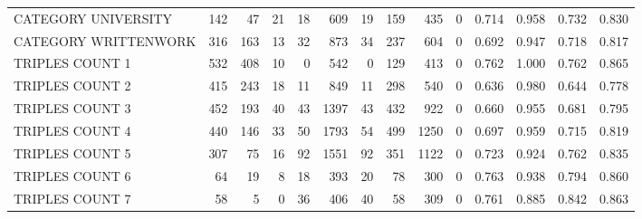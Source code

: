 \begin{tabular}{lrrrrrrrrrllll}
 CATEGORY UNIVERSITY      &             142 &            47 &              21 &              18 &             609 &   19 &  159 &  435 &    0 & 0.714 & 0.958 & 0.732 & 0.830 \\
 CATEGORY WRITTENWORK     &             316 &           163 &              13 &              32 &             873 &   34 &  237 &  604 &    0 & 0.692 & 0.947 & 0.718 & 0.817 \\
 TRIPLES COUNT 1          &             532 &           408 &              10 &               0 &             542 &    0 &  129 &  413 &    0 & 0.762 & 1.000 & 0.762 & 0.865 \\
 TRIPLES COUNT 2          &             415 &           243 &              18 &              11 &             849 &   11 &  298 &  540 &    0 & 0.636 & 0.980 & 0.644 & 0.778 \\
 TRIPLES COUNT 3          &             452 &           193 &              40 &              43 &            1397 &   43 &  432 &  922 &    0 & 0.660 & 0.955 & 0.681 & 0.795 \\
 TRIPLES COUNT 4          &             440 &           146 &              33 &              50 &            1793 &   54 &  499 & 1250 &    0 & 0.697 & 0.959 & 0.715 & 0.819 \\
 TRIPLES COUNT 5          &             307 &            75 &              16 &              92 &            1551 &   92 &  351 & 1122 &    0 & 0.723 & 0.924 & 0.762 & 0.835 \\
 TRIPLES COUNT 6          &              64 &            19 &               8 &              18 &             393 &   20 &   78 &  300 &    0 & 0.763 & 0.938 & 0.794 & 0.860 \\
 TRIPLES COUNT 7          &              58 &             5 &               0 &              36 &             406 &   40 &   58 &  309 &    0 & 0.761 & 0.885 & 0.842 & 0.863 \\
\hline
\end{tabular}